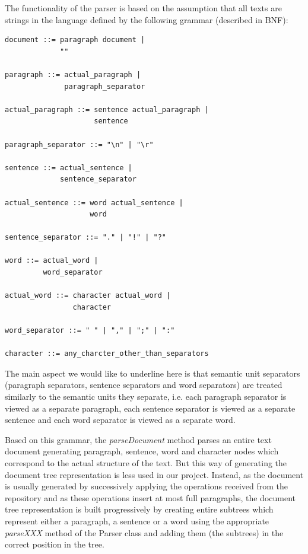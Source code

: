The functionality of the parser is based on the assumption that all texts are strings in
the language defined by the following grammar (described in BNF):

\begin{verbatim}
document ::= paragraph document |
             ""

paragraph ::= actual_paragraph |
              paragraph_separator

actual_paragraph ::= sentence actual_paragraph |
                     sentence

paragraph_separator ::= "\n" | "\r"

sentence ::= actual_sentence |
             sentence_separator

actual_sentence ::= word actual_sentence |
                    word

sentence_separator ::= "." | "!" | "?"

word ::= actual_word |
         word_separator

actual_word ::= character actual_word |
                character

word_separator ::= " " | "," | ";" | ":"

character ::= any_charcter_other_than_separators
\end{verbatim}

The main aspect we would like to underline here is that semantic unit separators (paragraph
separators, sentence separators and word separators) are treated similarly to the semantic
units they separate, i.e. each paragraph separator is viewed as a separate paragraph, each
sentence separator is viewed as a separate sentence and each word separator is viewed as a
separate word.

Based on this grammar, the \emph{parseDocument} method parses an entire text document
generating paragraph, sentence, word and character nodes which correspond to the actual
structure of the text. But this way of generating the document tree representation is
less used in our project. Instead, as the document is usually generated by successively
applying the operations received from the repository and as these operations insert at
most full paragraphs, the document tree representation is built progressively by creating
entire subtrees which represent either a paragraph, a sentence or a word using the
appropriate \emph{parseXXX} method of the Parser class and adding them (the subtrees)
in the correct position in the tree.

